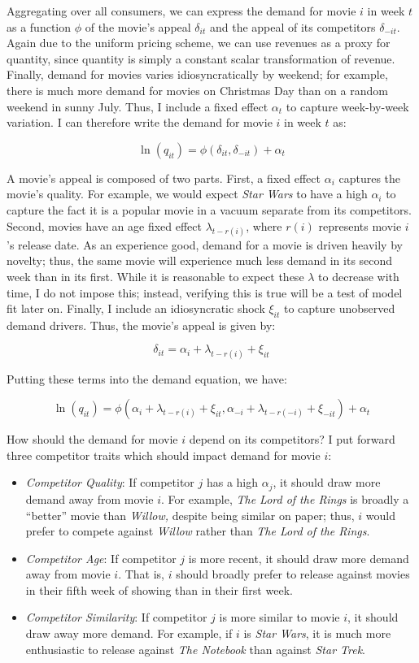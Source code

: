 \documentclass{article}
\begin{document}
Aggregating over all consumers, we can express the demand for movie $i$ in week $t$ as a function $\phi$ of the movie's appeal $\delta_{it}$ and the appeal of its competitors $\delta_{-it}$. Again due to the uniform pricing scheme, we can use revenues as a proxy for quantity, since quantity is simply a constant scalar transformation of revenue. Finally, demand for movies varies idiosyncratically by weekend; for example, there is much more demand for movies on Christmas Day than on a random weekend in sunny July. Thus, I include a fixed effect $\alpha_t$ to capture week-by-week variation. I can therefore write the demand for movie $i$ in week $t$ as:

$$\ln(q_{it}) = \phi(\delta_{it}, \delta_{-it}) + \alpha_t$$

A movie's appeal is composed of two parts. First, a fixed effect $\alpha_i$ captures the movie's quality. For example, we would expect \emph{Star Wars} to have a high $\alpha_i$ to capture the fact it is a popular movie in a vacuum separate from its competitors. Second, movies have an age fixed effect $\lambda_{t - r(i)}$, where $r(i)$ represents movie $i$'s release date. As an experience good, demand for a movie is driven heavily by novelty; thus, the same movie will experience much less demand in its second week than in its first. While it is reasonable to expect these $\lambda$ to decrease with time, I do not impose this; instead, verifying this is true will be a test of model fit later on. Finally, I include an idiosyncratic shock $\xi_{it}$ to capture unobserved demand drivers. Thus, the movie's appeal is given by:

$$\delta_{it} = \alpha_i + \lambda_{t - r(i)} + \xi_{it}$$

Putting these terms into the demand equation, we have:

$$\ln(q_{it}) = \phi(\alpha_i + \lambda_{t - r(i)} + \xi_{it}, \alpha_{-i} + \lambda_{t - r(-i)} + \xi_{-it}) + \alpha_t$$

How should the demand for movie $i$ depend on its competitors? I put forward three competitor traits which should impact demand for movie $i$:
\begin{itemize}
    \item \emph{Competitor Quality}: If competitor $j$ has a high $\alpha_j$, it should draw more demand away from movie $i$. For example, \emph{The Lord of the Rings} is broadly a ``better'' movie than \emph{Willow,} despite being similar on paper; thus, $i$ would prefer to compete against \emph{Willow} rather than \emph{The Lord of the Rings}.
    \item \emph{Competitor Age}: If competitor $j$ is more recent, it should draw more demand away from movie $i$. That is, $i$ should broadly prefer to release against movies in their fifth week of showing than in their first week.
    \item \emph{Competitor Similarity}: If competitor $j$ is more similar to movie $i$, it should draw away more demand. For example, if $i$ is \emph{Star Wars}, it is much more enthusiastic to release against \emph{The Notebook} than against \emph{Star Trek}.
\end{itemize}
\end{document}
